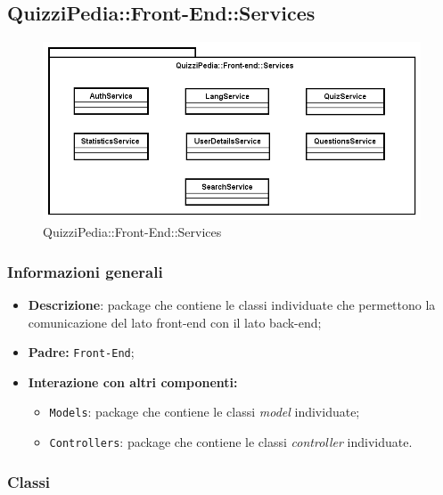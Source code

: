 \newpage
\subsection{QuizziPedia::Front-End::Services}
\begin{figure}[ht]
	\centering
	\includegraphics[scale=0.60]{UML/Package/QuizziPedia_Front-End_Services.png}
	\caption{QuizziPedia::Front-End::Services}
\end{figure} \FloatBarrier
\subsubsection{Informazioni generali}
\begin{itemize}
	\item \textbf{Descrizione}: package che contiene le classi individuate che permettono la comunicazione del lato front-end con il lato back-end;
	\item \textbf{Padre:} \texttt{Front-End};
	\item \textbf{Interazione con altri componenti:}
	\begin{itemize}
		\item \texttt{Models}: package che contiene le classi \textit{model} individuate;
		\item \texttt{Controllers}: package che contiene le classi \textit{controller} individuate.
	\end{itemize} 
\end{itemize}
\subsubsection{Classi}









